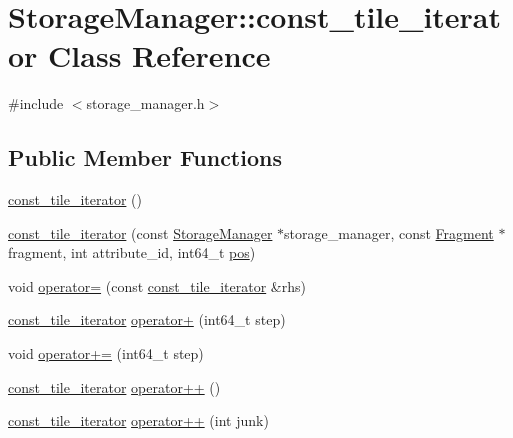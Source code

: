 \hypertarget{classStorageManager_1_1const__tile__iterator}{}\section{Storage\+Manager\+:\+:const\+\_\+tile\+\_\+iterator Class Reference}
\label{classStorageManager_1_1const__tile__iterator}


{\ttfamily \#include $<$storage\+\_\+manager.\+h$>$}

\subsection*{Public Member Functions}
\begin{DoxyCompactItemize}
\item 
\hyperlink{classStorageManager_1_1const__tile__iterator_a6e6e11c6001209429f33dfed306df839}{const\+\_\+tile\+\_\+iterator} ()
\item 
\hyperlink{classStorageManager_1_1const__tile__iterator_a28a1ea613f61e6e6d470a28d007a733d}{const\+\_\+tile\+\_\+iterator} (const \hyperlink{classStorageManager}{Storage\+Manager} $\ast$storage\+\_\+manager, const \hyperlink{classStorageManager_1_1Fragment}{Fragment} $\ast$fragment, int attribute\+\_\+id, int64\+\_\+t \hyperlink{classStorageManager_1_1const__tile__iterator_a92c60d92b20adf6833f922b47d3ef6a0}{pos})
\item 
void \hyperlink{classStorageManager_1_1const__tile__iterator_a9d4050cff1b6da5d310fc06a19c295f2}{operator=} (const \hyperlink{classStorageManager_1_1const__tile__iterator}{const\+\_\+tile\+\_\+iterator} \&rhs)
\item 
\hyperlink{classStorageManager_1_1const__tile__iterator}{const\+\_\+tile\+\_\+iterator} \hyperlink{classStorageManager_1_1const__tile__iterator_a2c1cdd488f999395f3624f0d34479fb4}{operator+} (int64\+\_\+t step)
\item 
void \hyperlink{classStorageManager_1_1const__tile__iterator_a5d48acd3b8a9ef1a41f68c404af7abeb}{operator+=} (int64\+\_\+t step)
\item 
\hyperlink{classStorageManager_1_1const__tile__iterator}{const\+\_\+tile\+\_\+iterator} \hyperlink{classStorageManager_1_1const__tile__iterator_a167f26e3442444cb0e24fdd707c9a8d2}{operator++} ()
\item 
\hyperlink{classStorageManager_1_1const__tile__iterator}{const\+\_\+tile\+\_\+iterator} \hyperlink{classStorageManager_1_1const__tile__iterator_ac6e93f493f82cd9546f43edd83beb2a9}{operator++} (int junk)

\end{DoxyCompactItemize}
